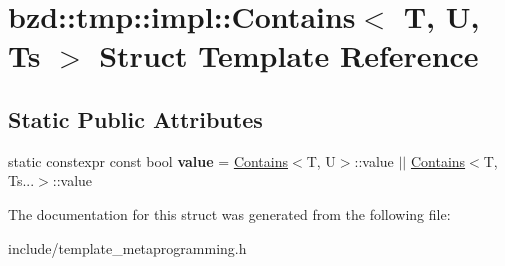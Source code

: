 \hypertarget{structbzd_1_1tmp_1_1impl_1_1Contains}{}\section{bzd\+:\+:tmp\+:\+:impl\+:\+:Contains$<$ T, U, Ts $>$ Struct Template Reference}
\label{structbzd_1_1tmp_1_1impl_1_1Contains}
\subsection*{Static Public Attributes}
\begin{DoxyCompactItemize}
\item 
\mbox{\label{structbzd_1_1tmp_1_1impl_1_1Contains_aa3aadf8ae53cf86f2f804b06653abcb2}} 
static constexpr const bool {\bfseries value} = \hyperlink{structbzd_1_1tmp_1_1impl_1_1Contains}{Contains}$<$T, U$>$\+::value $\vert$$\vert$ \hyperlink{structbzd_1_1tmp_1_1impl_1_1Contains}{Contains}$<$T, Ts...$>$\+::value
\end{DoxyCompactItemize}


The documentation for this struct was generated from the following file\+:\begin{DoxyCompactItemize}
\item 
include/template\+\_\+metaprogramming.\+h\end{DoxyCompactItemize}

